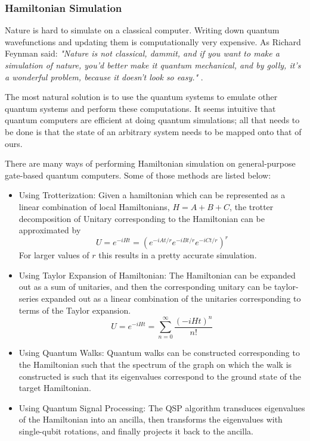 \subsubsection{Hamiltonian Simulation}

Nature is hard to simulate on a classical computer. Writing down quantum wavefunctions and updating them is computationally very expensive. As Richard Feynman said: \textit{"Nature is not classical, dammit, and if you want to make a simulation of nature, you'd better make it quantum mechanical, and by golly, it's a wonderful problem, because it doesn't look so easy." } \cite{feynman-quantum-simulating-physics}.

The most natural solution is to use the quantum systems to emulate other quantum systems and perform these computations. It seems intuitive that quantum computers are efficient at doing quantum simulations; all that needs to be done is that the state of an arbitrary system needs to be mapped onto that of ours.

There are many ways of performing Hamiltonian simulation on general-purpose gate-based quantum computers. Some of those methods are listed below:
\begin{itemize}
    \item Using Trotterization: Given a hamiltonian which can be represented as a linear combination of local Hamiltonians, $H = A + B + C$, the trotter decomposition of Unitary corresponding to the Hamiltonian can be approximated by
    \begin{equation}
        U = e^{-i H t} = (e^{-i A t / r} e^{-i B t / r} e^{-i C t / r})^r
    \end{equation}
    For larger values of $r$ this results in a pretty accurate simulation.
    \item Using Taylor Expansion of Hamiltonian: The Hamiltonian can be expanded out as a sum of unitaries, and then the corresponding unitary can be taylor-series expanded out as a linear combination of the unitaries corresponding to terms of the Taylor expansion.
    \begin{equation}
        U = e^{-i H t} = \sum_{n=0}^{\infty} \frac{(-i H t)^n}{n!}
    \end{equation}
    \item Using Quantum Walks: Quantum walks can be constructed corresponding to the Hamiltonian such that the spectrum of the graph on which the walk is constructed is such that its eigenvalues correspond to the ground state of the target Hamiltonian.
    \item Using Quantum Signal Processing: The QSP algorithm transduces eigenvalues of the Hamiltonian into an ancilla, then transforms the eigenvalues with single-qubit rotations, and finally projects it back to the ancilla.
\end{itemize}


